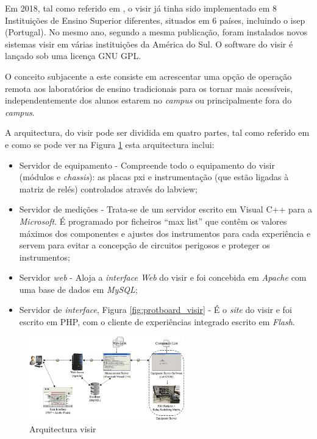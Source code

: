 Em 2018, tal como referido em \cite{PILARFederationVISIR}, o \acrshort{visir} já tinha sido implementado em 8 Instituições de Ensino Superior diferentes, situados em 6 países, incluindo o \acrshort{isep} (Portugal). No mesmo ano, segundo a mesma publicação, foram instalados novos sistemas \acrshort{visir} em várias instituições da América do Sul. O software do \acrshort{visir} é lançado sob uma licença GNU GPL.

O conceito subjacente a este consiste em acrescentar uma opção de operação remota aos laboratórios de ensino tradicionais para os tornar mais acessíveis, independentemente dos alunos estarem no \textit{campus} ou principalmente fora do \textit{campus}\cite{TheVISIRproject}.

A arquitectura, do \acrshort{visir} pode ser dividida em quatro partes, tal como referido em \cite{tawfikexperiences} e como se pode ver na Figura \ref{fig:arquitecturavisir} esta arquitectura inclui:
\begin{itemize}
    \item Servidor de equipamento - Compreende todo o equipamento do \acrshort{visir} (módulos e \textit{chassis}): as placas \acrfull{pxi} e instrumentação (que estão ligadas à matriz de relés) controlados através do \acrshort{labview};
    \item Servidor de medições - Trata-se de um servidor escrito em Visual C++ para a \textit{Microsoft}. É programado por ficheiros ``max list'' que contêm os valores máximos dos componentes e ajustes dos instrumentos para cada experiência e servem para evitar a concepção de circuitos perigosos e proteger os instrumentos;
    \item Servidor \textit{web} - Aloja a \textit{interface Web} do \acrshort{visir} e foi concebida em \textit{Apache} com uma base de dados em \textit{MySQL};
    \item Servidor de \textit{interface}, Figura \ref{fig:protboard_visir} - É o \textit{site} do \acrshort{visir} e foi escrito em PHP, com o cliente de experiências integrado escrito em \textit{Flash}.
\end{itemize}

\begin{figure}[hbtp]
    \centering
    \includegraphics[width=0.6\textwidth]{figures/arquitectura_VISIR.png}
    \caption{Arquitectura \acrshort{visir}\cite{tawfikexperiences}}
    \label{fig:arquitecturavisir}
\end{figure}

